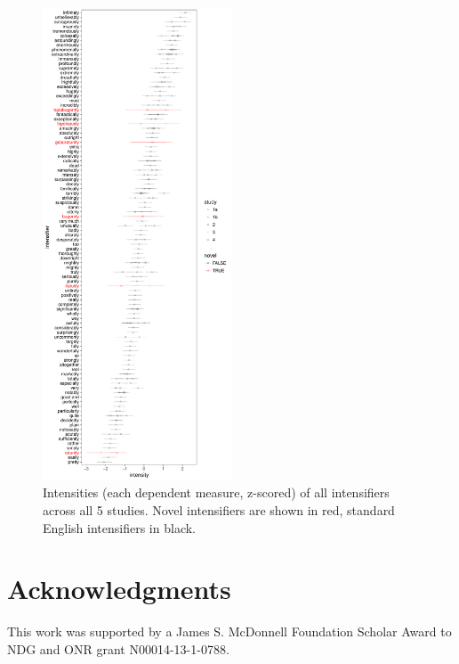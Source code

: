 \documentclass[10pt,letterpaper]{article}
\newcommand{\todo}[1]{{\color{red}#1}}
\begin{document}

\begin{figure}[hbt]
\begin{center}
\includegraphics[width=0.5\textwidth]{images/intensities.pdf}
\end{center}
\caption{Intensities (each dependent measure, z-scored) of all intensifiers across all 5 studies. Novel intensifiers are shown in red, standard English intensifiers in black.}
\label{fig:intensities}
\end{figure}

\section{Acknowledgments}

This work was supported by a James S. McDonnell Foundation Scholar Award to NDG and ONR grant N00014-13-1-0788.


\end{document}
